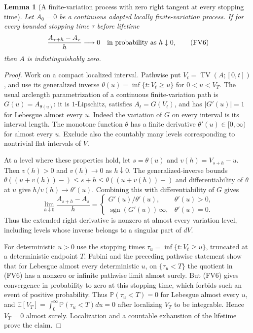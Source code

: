 \documentclass[11pt]{article}
\newtheorem{lemma}[theorem]{Lemma}
\theoremstyle{definition}\newtheorem{definition}[theorem]{Definition}
\theoremstyle{remark}\newtheorem{remark}[theorem]{Remark}
\begin{document}
\begin{lemma}[A finite-variation process with zero right tangent at every stopping time]
\label{lem:fv-zero-stopping-tangents}
Let $A_0=0$ be a continuous adapted locally finite-variation process. If
for every bounded stopping time $\tau$ before lifetime
\[
 \frac{A_{\tau+h}-A_\tau}{h}\longrightarrow0
       \quad\hbox{in probability as }h\downarrow0,
 \tag{FV6}
\]
then $A$ is indistinguishably zero.
\end{lemma}
\begin{proof}
Work on a compact localized interval. Pathwise put
$V_t=\operatorname{TV}(A;[0,t])$, and use its generalized inverse
$\theta(u)=\inf\{t:V_t\ge u\}$ for $0<u<V_T$. The usual arclength
parametrization of a continuous finite-variation path is
$G(u)=A_{\theta(u)}$: it is $1$-Lipschitz, satisfies
$A_t=G(V_t)$, and has $|G'(u)|=1$ for Lebesgue almost every $u$.
Indeed the variation of $G$ on every interval is its interval length.
The monotone function $\theta$ has a finite derivative
$\theta'(u)\in[0,\infty)$ for almost every $u$. Exclude also the
countably many levels corresponding to nontrivial flat intervals of $V$.

At a level where these properties hold, let $s=\theta(u)$ and
$v(h)=V_{s+h}-u$. Then $v(h)>0$ and $v(h)\to0$ as $h\downarrow0$.
The generalized-inverse bounds
$\theta((u+v(h))- )\le s+h\le\theta((u+v(h))+ )$
and differentiability of $\theta$ at $u$ give
$h/v(h)\to\theta'(u)$. Combining this with differentiability of $G$ gives
\[
 \lim_{h\downarrow0}\frac{A_{s+h}-A_s}{h}
 =\begin{cases}
 G'(u)/\theta'(u),&\theta'(u)>0,\\
 \operatorname{sgn}(G'(u))\,\infty,&\theta'(u)=0.
 \end{cases}
 \tag{FV7}
\]
Thus the extended right derivative is nonzero at almost every variation
level, including levels whose inverse belongs to a singular part of $dV$.

For deterministic $u>0$ use the stopping times
$\tau_u=\inf\{t:V_t\ge u\}$, truncated at a deterministic endpoint $T$.
Fubini and the preceding pathwise statement show that for Lebesgue
almost every deterministic $u$, on $\{\tau_u<T\}$ the quotient in
(FV6) has a nonzero or infinite pathwise limit almost surely.
But (FV6) gives convergence in probability to zero at this stopping time,
which forbids such an event of positive probability. Thus
$\mathbb P(\tau_u<T)=0$ for Lebesgue almost every $u$, and
$\mathbb E[V_T]=\int_0^\infty\mathbb P(\tau_u<T)du=0$ after localizing
$V_T$ to be integrable. Hence $V_T=0$ almost surely. Localization and a
countable exhaustion of the lifetime prove the claim.
\end{proof}
\end{document}
